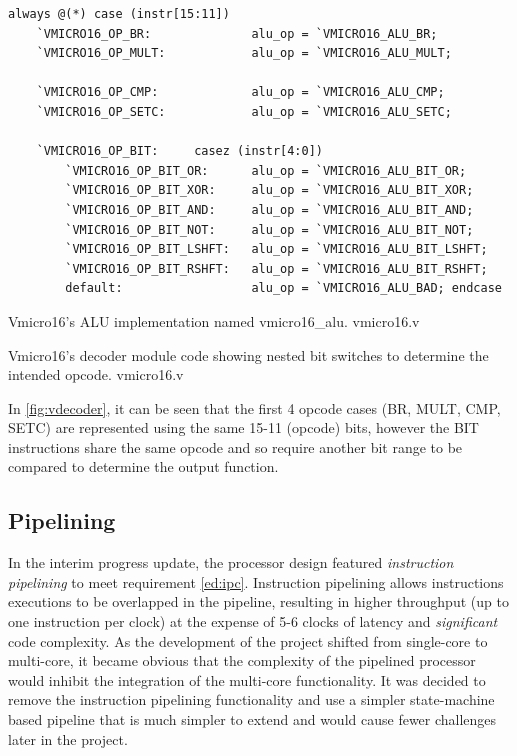 \begin{listing}[H]
\centering
\begin{verbatim}
always @(*) case (instr[15:11])
    `VMICRO16_OP_BR:              alu_op = `VMICRO16_ALU_BR;
    `VMICRO16_OP_MULT:            alu_op = `VMICRO16_ALU_MULT;

    `VMICRO16_OP_CMP:             alu_op = `VMICRO16_ALU_CMP;
    `VMICRO16_OP_SETC:            alu_op = `VMICRO16_ALU_SETC;
    
    `VMICRO16_OP_BIT:     casez (instr[4:0])
        `VMICRO16_OP_BIT_OR:      alu_op = `VMICRO16_ALU_BIT_OR;
        `VMICRO16_OP_BIT_XOR:     alu_op = `VMICRO16_ALU_BIT_XOR;
        `VMICRO16_OP_BIT_AND:     alu_op = `VMICRO16_ALU_BIT_AND;
        `VMICRO16_OP_BIT_NOT:     alu_op = `VMICRO16_ALU_BIT_NOT;
        `VMICRO16_OP_BIT_LSHFT:   alu_op = `VMICRO16_ALU_BIT_LSHFT;
        `VMICRO16_OP_BIT_RSHFT:   alu_op = `VMICRO16_ALU_BIT_RSHFT;
        default:                  alu_op = `VMICRO16_ALU_BAD; endcase
\end{verbatim}
\caption{Vmicro16's ALU implementation named vmicro16\_alu. vmicro16.v}
\caption{Vmicro16's decoder module code showing nested bit switches to determine the intended opcode. vmicro16.v}
\label{fig:vdecoder}
\end{listing}

In \cref{fig:vdecoder}, it can be seen that the first 4 opcode cases (BR, MULT, CMP, SETC) are represented using the same 15-11 (opcode) bits, however the BIT instructions share the same opcode and so require another bit range to be compared to determine the output function.



\subsection{Pipelining}
In the interim progress update, the processor design featured \textit{instruction pipelining} to meet requirement \ref{ed:ipc}. Instruction pipelining allows instructions executions to be overlapped in the pipeline, resulting in higher throughput (up to one instruction per clock) at the expense of 5-6 clocks of latency and \textit{significant} code complexity. As the development of the project shifted from single-core to multi-core, it became obvious that the complexity of the pipelined processor would inhibit the integration of the multi-core functionality. It was decided to remove the instruction pipelining functionality and use a simpler state-machine based pipeline that is much simpler to extend and would cause fewer challenges later in the project. 


